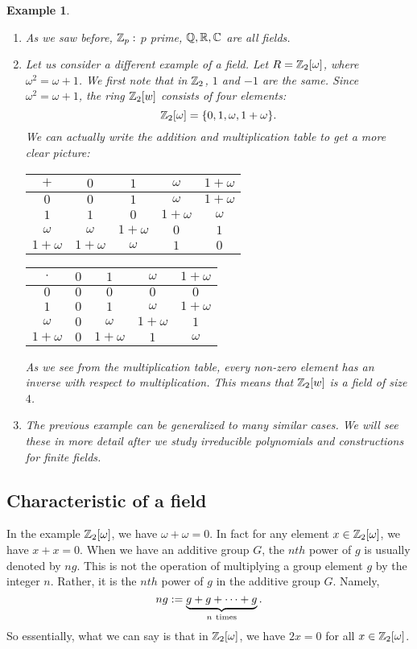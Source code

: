 \documentclass[12pt]{article}
\theoremstyle{plain}
\newtheorem{example}{Example}
\theoremstyle{definition}
\theoremstyle{remark}
\begin{document}
\begin{example}
\begin{enumerate}
    \item As we saw before, $\mathbb{Z}_p:$ $p$ prime, $\mathbb{Q}, \mathbb{R}, \mathbb{C}$ are all fields.
    \item Let us consider a different example of a field. Let $R = \mathbb{Z}_2[\omega]$, where $\omega^2=\omega+1$. We first note that in $\mathbb{Z}_2$, $1$ and $-1$ are the same. Since $\omega^2=\omega+1$, the ring $\mathbb{Z}_2[w]$ consists of four elements:
    $$\mathbb{Z}_2[\omega] = \{0, 1, \omega, 1+\omega\}.$$
    We can actually write the addition and multiplication table to get a more clear picture:


\begin{table}[H]
\qquad \quad
\begin{tabular}{ c| c | c |c|c}
$+$  & $0$ & $1$ & $\omega$ & $1+\omega$ \\
\hline
$0$ & $0$ & $1$ & $\omega$ & $1+\omega$  \\
\hline
$1$ & $1$ & $0$ & $1+\omega$ & $\omega$  \\
\hline
$\omega$ & $\omega$ & $1+\omega$ & $0$ & $1$ \\
\hline
$1+\omega$ & $1+\omega$& $\omega$ & $1$&$0$\\

\end{tabular}
\quad \quad \quad \quad \quad \quad \quad
\begin{tabular}{ c| c | c |c|c}
$\cdot$  & $0$ & $1$ & $\omega$ & $1+\omega$ \\
\hline
$0$ & $0$ & $0$ & $0$ & $0$  \\
\hline
$1$ & $0$ & $1$ & $\omega$ & $1+\omega$  \\
\hline
$\omega$ & $0$ & $\omega$ & $1+\omega$ & $1$ \\
\hline
$1+\omega$ & $0$& $1+\omega$ & $1$&$\omega$\\

\end{tabular}
\end{table}
As we see from the multiplication table, every non-zero element has an inverse with respect to multiplication. This means that $\mathbb{Z}_2[w]$ is a field of size $4$.
\item The previous example can be generalized to many similar cases. We will see these in more detail after we study irreducible polynomials and constructions for finite fields.
\end{enumerate}
\end{example}
\subsection{Characteristic of a field}
In the example $\mathbb{Z}_2[\omega]$, we have $\omega+\omega=0$. In fact for any element $x \in \mathbb{Z}_2[\omega]$, we have $x+x=0$.
When we have an additive group $G$, the $nth$ power of $g$ is usually denoted by $ng$. This is not the operation of multiplying a group element $g$ by the integer $n$. Rather, it is the $nth$ power of $g$ in the additive group $G$. Namely,
$$ng:=\underbrace{g + g+\cdots + g}_{n\rm\ times}.$$
So essentially, what we can say is that in $\mathbb{Z}_2[\omega]$, we have $2x=0$ for all $x\in \mathbb{Z}_2[\omega]$.
\end{document}
